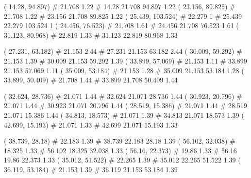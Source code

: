 \documentclass[a4paper,openbib,10pt]{article}
\newenvironment{treegraph}{\begin{graph}}{\end{graph}}
\begin{document}
\begin{treegraph}
  ( 14.28, 94.897) #     21.708    1.22
   #    14.28    21.708    94.897    1.22
  ( 23.156, 89.825) #     21.708    1.22
   #    23.156    21.708    89.825    1.22
  ( 25.439, 103.524) #     22.279    1
   #    25.439    22.279    103.524    1
  ( 24.456, 76.523) #     21.708    1.61
   #    24.456    21.708    76.523    1.61
  ( 31.123, 80.968) #     22.819    1.33
   #    31.123    22.819    80.968    1.33

  ( 27.231, 63.182) #     21.153    2.44
   #    27.231    21.153    63.182    2.44
  ( 30.009, 59.292) #     21.153    1.39
   #    30.009    21.153    59.292    1.39
  ( 33.899, 57.069) #     21.153    1.11
   #    33.899    21.153    57.069    1.11
  ( 35.009, 53.184) #     21.153    1.28
   #    35.009    21.153    53.184    1.28
  ( 33.899, 50.409) #     21.708    1.44
   #    33.899    21.708    50.409    1.44

  ( 32.624, 28.736) #     21.071    1.44
   #    32.624    21.071    28.736    1.44
  ( 30.923, 20.796) #     21.071    1.44
   #    30.923    21.071    20.796    1.44
  ( 28.519, 15.386) #     21.071    1.44
   #    28.519    21.071    15.386    1.44
  ( 34.813, 18.573) #     21.071    1.39
   #    34.813    21.071    18.573    1.39
  ( 42.699, 15.193) #     21.071    1.33
   #    42.699    21.071    15.193    1.33

  ( 38.739, 28.18) #     22.183    1.39
   #    38.739    22.183    28.18    1.39
  ( 56.102, 32.038) #     18.325    1.33
   #    56.102    18.325    32.038    1.33
  ( 56.16, 22.373) #     19.86    1.33
   #    56.16    19.86    22.373    1.33
  ( 35.012, 51.522) #     22.265    1.39
   #    35.012    22.265    51.522    1.39
  ( 36.119, 53.184) #     21.153    1.39
   #    36.119    21.153    53.184    1.39


\end{treegraph}
\end{document}
